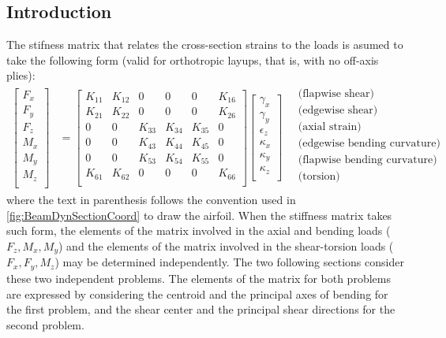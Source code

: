 \documentclass[11pt]{article}
\begin{document}
\subsection{Introduction}
The stifness matrix that relates the cross-section strains to the loads is asumed to take the following form (valid for orthotropic layups, that is, with no off-axis plies):
\begin{align}
    \begin{bmatrix}
    F_x \\ F_y\\ F_z \\ M_x \\ M_y\\ M_z\\ 
    \end{bmatrix}
&=
    \begin{bmatrix}
K_{11} & K_{12} & 0      & 0      & 0      & K_{16} \\
K_{21} & K_{22} & 0      & 0      & 0      & K_{26} \\
0      & 0      & K_{33} & K_{34} & K_{35} & 0      \\
0      & 0      & K_{43} & K_{44} & K_{45} & 0      \\
0      & 0      & K_{53} & K_{54} & K_{55} & 0      \\
K_{61} & K_{62} & 0      & 0       & 0  & K_{66} \\
\end{bmatrix}
    \begin{bmatrix}
    \gamma_{x} \\ \gamma_{y} \\     \epsilon_z \\ \kappa_x \\ \kappa_y\\ \kappa_z \\
    \end{bmatrix}
     \quad
    \begin{matrix}
   \text{(flapwise shear)}\\
   \text{(edgewise shear)}\\
   \text{(axial strain)}\\
   \text{(edgewise bending curvature)}\\
   \text{(flapwise bending curvature)}\\
   \text{(torsion)}\\
    \end{matrix}
\end{align}
where the text in parenthesis follows the convention used in \autoref{fig:BeamDynSectionCoord} to draw the airfoil.
When the stiffness matrix takes such form, the elements of the matrix involved in the axial and bending loads ($F_z,M_x,M_y$) and the elements of the matrix involved in the shear-torsion loads ($F_x,F_y,M_z$) may be determined independently. The two following sections consider these two independent problems. The elements of the matrix for both problems are expressed by considering the centroid and the principal axes of bending for the first problem, and the shear center and the principal shear directions for the second problem.
\end{document}
